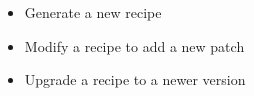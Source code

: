 {
  \begin{itemize}
    \item Generate a new recipe
    \item Modify a recipe to add a new patch
    \item Upgrade a recipe to a newer version
  \end{itemize}
}
